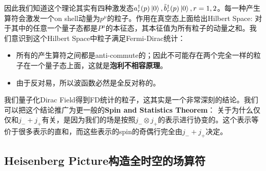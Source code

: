 \bigskip
{}

因此我们知道这个理论其实有四种激发态$
a_r^\dagger(p)\ket{0},\tilde{b}_r^\dagger(p)\ket{0} ,r = 1,2
$。每一种产生算符会激发一个on shell动量为$ p^\mu $的粒子。作用在真空态上面给出Hilbert Space:
对于其中的任意一个量子态都是$ P^\mu $的本征态，其本征值为所有粒子的动量之和。我们意识到这个Hilbert
Space中粒子满足Fermi-Dirac统计：
\begin{itemize}
  \item 所有的产生算符之间都是anti-commute的；因此不可能存在两个完全一样的粒子在一个量子态上面，这就是\textbf{泡利不相容原理}。
  \item 由于反对易，所以波函数必然是全反对称的。
\end{itemize}

\bigskip
{}

我们量子化Dirac Field得到FD统计的粒子，这其实是一个非常深刻的结论。我们可以把这个结论推广为更一般的\textbf{Spin
and Statistics Theorem}：
关于为什么仅仅和$ j_-+j_+ $有关，是因为我们的场是按照$ j_- \otimes j_+
$的表示进行协变的。这个表示等价于很多表示的直和，而这些表示的spin的奇偶行完全由$ j_- + j_+ $决定。

\subsection{Heisenberg Picture构造全时空的场算符}

